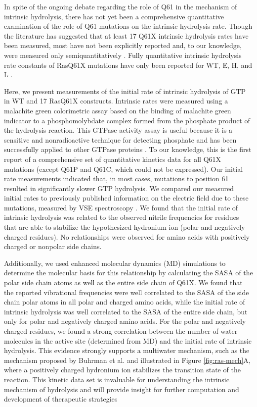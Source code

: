 In spite of the ongoing debate regarding the role of Q61 in the mechanism of intrinsic hydrolysis, there has not yet been a comprehensive quantitative examination of the role of Q61 mutations on the intrinsic hydrolysis rate. 
Though the literature has suggested that at least 17 Q61X intrinsic hydrolysis rates have been measured, most have not been explicitly reported and, to our knowledge, were measured only semiquantitatively \cite{Der1986}.
Fully quantitative intrinsic hydrolysis rate constants of RasQ61X mutations have only been reported for WT, E, H, and L \cite{Krengel1990, Frech1994}.

Here, we present measurements of the initial rate of intrinsic hydrolysis of GTP in WT and 17 RasQ61X constructs. 
Intrinsic rates were measured using a malachite green colorimetric assay based on the binding of malachite green indicator to a phosphomolybdate complex formed from the phosphate product of the hydrolysis reaction. 
This GTPase activity assay is useful because it is a sensitive and nonradioactive technique for detecting phosphate and has been successfully applied to other GTPase proteins \cite{Quan2005}.
To our knowledge, this is the first report of a comprehensive set of quantitative kinetics data for all Q61X mutations (except Q61P and Q61C, which could not be expressed). 
Our initial rate measurements indicated that, in most cases, mutations to position 61 resulted in significantly slower GTP hydrolysis. 
We compared our measured initial rates to previously published information on the electric field due to these mutations, measured by VSE spectroscopy \cite{Stafford2012}.
We found that the initial rate of intrinsic hydrolysis was related to the observed nitrile frequencies for residues that are able to stabilize the hypothesized hydronium ion (polar and negatively charged residues). 
No relationships were observed for amino acids with positively charged or nonpolar side chains.

Additionally, we used enhanced molecular dynamics (MD) simulations to determine the molecular basis for this relationship by calculating the SASA of the polar side chain atoms as well as the entire side chain of Q61X. 
We found that the reported vibrational frequencies were well correlated to the SASA of the side chain polar atoms in all polar and charged amino acids, while the initial rate of intrinsic hydrolysis was well correlated to the SASA of the entire side chain, but only for polar and negatively charged amino acids. 
For the polar and negatively charged residues, we found a strong correlation between the number of water molecules in the active site (determined from MD) and the initial rate of intrinsic hydrolysis.
This evidence strongly supports a multiwater mechanism, such as the mechanism proposed by Buhrman et al. and illustrated in Figure \ref{fig:ras-mech}A, where a positively charged hydronium ion stabilizes the transition state of the reaction. 
This kinetic data set is invaluable for understanding the intrinsic mechanism of hydrolysis and will provide insight for further computation and development of therapeutic strategies


